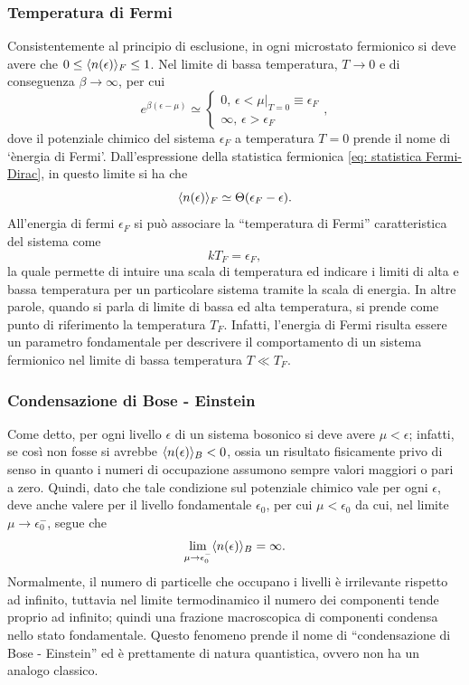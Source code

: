 \subsubsection{Temperatura di Fermi}
Consistentemente al principio di esclusione, in ogni microstato fermionico si deve avere che $0 \le \langle n(\epsilon) \rangle_F \le 1$. Nel limite di bassa temperatura, $T \to 0$ e di conseguenza $\beta \to \infty$, per cui
\begin{equation}
    e^{\beta(\epsilon - \mu)} \simeq
    \begin{cases}
        0,\, \epsilon < \mu|_{T=0} \equiv \epsilon_F \\
        \infty,\, \epsilon > \epsilon_F
    \end{cases},
\end{equation}
dove il potenziale chimico del sistema $\epsilon_F$ a temperatura $T = 0$ prende il nome di `ènergia di Fermi'. Dall'espressione della statistica fermionica \eqref{eq: statistica Fermi-Dirac}, in questo limite si ha che
\begin{equation}
    \langle n(\epsilon) \rangle_F \simeq \Theta(\epsilon_ F - \epsilon).
\end{equation}
All'energia di fermi $\epsilon_F$ si può associare la ``temperatura di Fermi'' caratteristica del sistema come
\begin{equation}
    kT_F = \epsilon_F,
\end{equation}
la quale permette di intuire una scala di temperatura ed indicare i limiti di alta e bassa temperatura per un particolare sistema tramite la scala di energia. In altre parole, quando si parla di limite di bassa ed alta temperatura, si prende come punto di riferimento la temperatura $T_F$. Infatti, l'energia di Fermi risulta essere un parametro fondamentale per descrivere il comportamento di un sistema fermionico nel limite di bassa temperatura $T \ll T_F$. 

\subsubsection{Condensazione di Bose - Einstein}
Come detto, per ogni livello $\epsilon$ di un sistema bosonico si deve avere $\mu < \epsilon$; infatti, se così non fosse si avrebbe $\langle n(\epsilon) \rangle_B < 0$, ossia un risultato fisicamente privo di senso in quanto i numeri di occupazione assumono sempre valori maggiori o pari a zero. Quindi, dato che tale condizione sul potenziale chimico vale per ogni $\epsilon$, deve anche valere per il livello fondamentale $\epsilon_0$, per cui $\mu < \epsilon_0$ da cui, nel limite $\mu \to \epsilon_0^-$, segue che
\begin{equation}
\label{eq: condensazione Bose-Einstein}
    \lim_{\mu \to \epsilon_0^-}\langle n(\epsilon) \rangle_B = \infty.
\end{equation}
Normalmente, il numero di particelle che occupano i livelli è irrilevante rispetto ad infinito, tuttavia nel limite termodinamico il numero dei componenti tende proprio ad infinito; quindi una frazione macroscopica di componenti condensa nello stato fondamentale. Questo fenomeno prende il nome di ``condensazione di Bose - Einstein'' ed è prettamente di natura quantistica, ovvero non ha un analogo classico.


